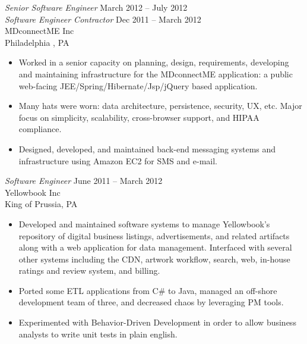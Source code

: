 \documentclass[margin]{res}
\begin{document}
\begin{resume}
  {\sl Senior Software Engineer} \hfill March 2012  -- July 2012 \\
  {\sl Software Engineer Contractor} \hfill Dec 2011 -- March 2012 \\
  MDconnectME Inc \\
  Philadelphia , PA
  \begin{itemize} \itemsep -2pt %
    \item Worked in a senior capacity on planning, design, requirements, developing and maintaining infrastructure for the MDconnectME application: a public web-facing JEE/Spring/Hibernate/Jsp/jQuery based application.
    \item Many hats were worn: data architecture, persistence, security, UX, etc.  Major focus on simplicity, scalability, cross-browser support, and HIPAA compliance.
    \item Designed, developed, and maintained back-end messaging systems and infrastructure using Amazon EC2 for SMS and e-mail.
  \end{itemize}


  {\sl Software Engineer} \hfill  June 2011 -- March 2012 \\
    Yellowbook Inc \\
    King of Prussia, PA
    \begin{itemize} \itemsep -2pt %
      \item Developed and maintained software systems to manage Yellowbook's repository of digital business listings, advertisements, and related artifacts along with a web application for data management.
            Interfaced with several other systems including the CDN, artwork workflow, search, web, in-house ratings and review system, and billing.
      \item Ported some ETL applications from C\# to Java, managed an off-shore development team of three, and decreased chaos by leveraging PM tools.
      \item Experimented with Behavior-Driven Development in order to allow business analysts to write unit tests in plain english.
    \end{itemize}



\end{resume}
\end{document}
